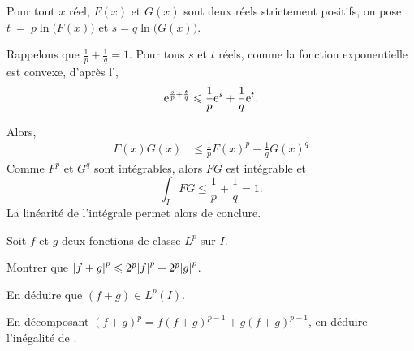 \begin{solution}
\begin{reponses}
\item Pour tout $x$ réel, $F(x)$ et $G(x)$ sont deux réels strictement positifs, on pose $t~=~p \ln\mathopen{}\big(F(x)\big)$ et $s = q \ln\mathopen{}\big(G(x)\big)$.

\item Rappelons que $\frac{1}{p} + \frac{1}{q} = 1$. Pour tous $s$ et $t$ réels, comme la fonction exponentielle est convexe, d'après l',
\[
\mathrm{e}^{\frac{s}{p} + \frac{t}{q}} \leqslant \frac{1}{p} \mathrm{e}^s + \frac{1}{q} \mathrm{e}^t.
\]

\item Alors,
\begin{align*}
F(x) G(x) &\leqslant \frac{1}{p} F(x)^p + \frac{1}{q} G(x)^q
\end{align*}
Comme $F^p$ et $G^q$ sont intégrables, alors $F G$ est intégrable et
\[
\int_I F G \leqslant \frac{1}{p} + \frac{1}{q} = 1.
\]
La linéarité de l'intégrale permet alors de conclure.
\end{reponses}
\end{solution}

\begin{exercice}
Soit $f$ et $g$ deux fonctions de classe $L^p$ sur $I$.
\begin{questions}
\item Montrer que $\mathopen{}\left| f + g \right|^p \leqslant 2^p \mathopen{}\left| f \right|^p + 2^p \mathopen{}\left| g \right|^p$.

\item En déduire que $(f + g) \in L^p(I)$.

\item En décomposant $(f + g)^p = f (f + g)^{p-1} + g (f + g)^{p-1}$, en déduire l'inégalité de .
\end{questions}
\end{exercice}

